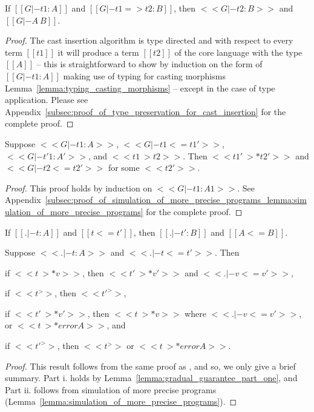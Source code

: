 \begin{lemma}
  \label{lemma:type_preservation_for_cast_insertion}
  If $[[G |- t1 : A]]$ and $[[G |- t1 => t2 : B]]$, then $<<G |- t2 : B>>$ and $[[G |- A ~ B]]$.
\end{lemma}
\begin{proof}
  The cast insertion algorithm is type directed and with respect to
  every term $[[t1]]$ it will produce a term $[[t2]]$ of the core
  language with the type $[[A]]$ -- this is straightforward to show by
  induction on the form of $[[G |- t1 : A]]$ making use of typing for
  casting morphisms Lemma~\ref{lemma:typing_casting_morphisms} --
  except in the case of type application.  Please see
  Appendix~\ref{subsec:proof_of_type_preservation_for_cast_insertion}
  for the complete proof.
\end{proof}

\begin{lemma}
  \label{lemma:simulation_of_more_precise_programs}
  Suppose $<<G |- t1 : A>>$, $<<G |- t1 <= t1'>>$, $<<G |- t'1 : A'>>$, and $<<t1 ~> t2>>$.
  Then $<<t1' ~>* t2'>>$ and $<<G |- t2 <= t2'>>$ for some $<<t2'>>$.
\end{lemma}
\begin{proof}
  This proof holds by induction on $<<G |- t1 : A1>>$.  See
  Appendix~\ref{subsec:proof_of_simulation_of_more_precise_programs_lemma:simulation_of_more_precise_programs}
  for the complete proof.
\end{proof}

\begin{theorem}
  \label{thm:gradual_guarantee} 
  \begin{enumR}
  \item[] 
  \item If $[[. |- t : A]]$ and $[[t <= t']]$, then $[[. |- t' : B]]$ and $[[A <= B]]$.
  \item Suppose $<<. |- t : A>>$ and $<<. |- t <= t'>>$. Then
    \begin{enumA}
    \item if $<<t ~>* v>>$, then $<<t' ~>* v'>>$ and $<<. |- v <= v'>>$,
    \item if $<<t ^>>$, then $<<t' ^>>$,
    \item if $<<t' ~>* v'>>$, then $<<t ~>* v>>$ where $<<. |- v <= v'>>$, or $<<t ~>* error A>>$, and
    \item if $<<t' ^>>$, then $<<t ^>>$ or $<<t ~>* error A>>$.
    \end{enumA}
  \end{enumR}
\end{theorem}
\begin{proof}
  This result follows from the same proof as \cite{Siek:2015}, and so,
  we only give a brief summary.  Part i. holds by
  Lemma~\ref{lemma:gradual_guarantee_part_one}, and Part ii. follows
  from simulation of more precise programs
  (Lemma~\ref{lemma:simulation_of_more_precise_programs}).
\end{proof}

